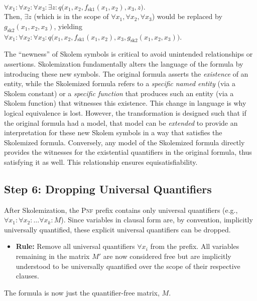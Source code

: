 \begin{enumerate}[(a)]
\begin{itemize}
              \\[0.2cm]
              \hspace*{1.3cm}
              $\forall x_1: \forall x_2: \forall x_3: \exists z: q\bigl(x_1, x_2, f_{\mathrm{sk1}}(x_1, x_2), x_3, z\bigr)$.
              \\[0.2cm]
              Then, $\exists z$ (which is in the scope of $\forall x_1, \forall x_2, \forall x_3$) would be replaced by $g_{\mathrm{sk2}}(x_1, x_2,
              x_3)$, yielding
              \\[0.2cm]
              \hspace*{1.3cm}
              $\forall x_1: \forall x_2: \forall x_3: q\bigl(x_1, x_2, f_{\mathrm{sk1}}(x_1, x_2), x_3, g_{\mathrm{sk2}}(x_1, x_2, x_3)\bigr)$. 
    \end{itemize}
\end{enumerate}
The ``newness'' of Skolem symbols is critical to avoid unintended relationships or assertions. Skolemization fundamentally alters the language of the formula by introducing these new symbols. The original formula asserts the \textit{existence} of an entity, while the Skolemized formula refers to a \textit{specific named entity} (via a Skolem constant) or a \textit{specific function} that produces such an entity (via a Skolem function) that witnesses this existence. This change in language is why logical equivalence is lost. However, the transformation is designed such that if the original formula had a model, that model can be \textit{extended} to provide an interpretation for these new Skolem symbols in a way that satisfies the Skolemized formula. Conversely, any model of the Skolemized formula directly provides the witnesses for the existential quantifiers in the original formula, thus satisfying it as well. This relationship ensures equisatisfiability.

\subsection{Step 6: Dropping Universal Quantifiers}
After Skolemization, the \textsc{Pnf} prefix contains only universal quantifiers (e.g., $\forall x_1: \forall x_2: \dots \forall x_k: M$). Since variables in clausal form are, by convention, implicitly universally quantified, these explicit universal quantifiers can be dropped.
\begin{itemize}
    \item \textbf{Rule:} Remove all universal quantifiers $\forall x_i$ from the prefix. All variables remaining in the matrix $M'$ are now considered free but are implicitly understood to be universally quantified over the scope of their respective clauses.
\end{itemize}
The formula is now just the quantifier-free matrix, $M$.

